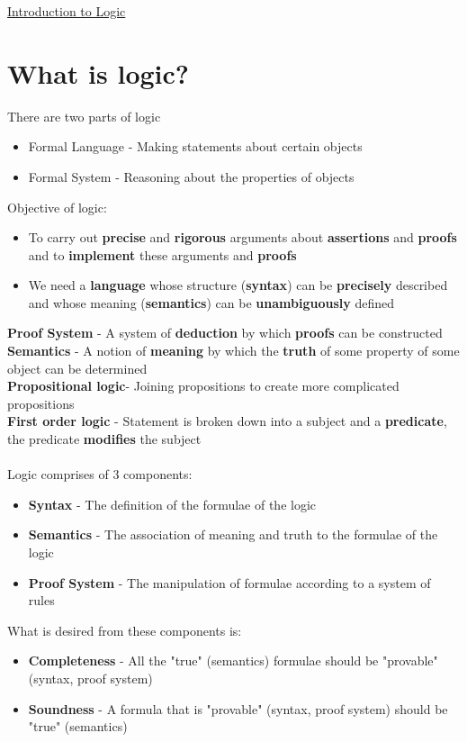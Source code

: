 \documentclass{article}[18pt]
\begin{document}
\begin{center}
\underline{\huge Introduction to Logic}
\end{center}

\section{What is logic?}
There are two parts of logic
\begin{itemize}
\item Formal Language - Making statements about certain objects
\item Formal System - Reasoning about the properties of objects
\end{itemize}
Objective of logic:
\begin{itemize}
\item To carry out \textbf{precise} and \textbf{rigorous} arguments about \textbf{assertions} and \textbf{proofs} and to \textbf{implement} these arguments and \textbf{proofs}
\item We need a \textbf{language} whose structure (\textbf{syntax}) can be \textbf{precisely} described and whose meaning (\textbf{semantics}) can be \textbf{unambiguously} defined
\end{itemize}
\textbf{Proof System} - A system of \textbf{deduction} by which \textbf{proofs} can be constructed\\
\textbf{Semantics} - A notion of \textbf{meaning} by which the \textbf{truth} of some property of some object can be determined\\



\textbf{Propositional logic}- Joining propositions to create more complicated propositions\\
\textbf{First order logic} - Statement is broken down into a subject and a \textbf{predicate}, the predicate \textbf{modifies} the subject\\
\\
Logic comprises of 3 components:
\begin{itemize}
\item \textbf{Syntax} - The definition of the formulae of the logic
\item \textbf{Semantics} - The association of meaning and truth to the formulae of the logic
\item \textbf{Proof System} - The manipulation of formulae according to a system of rules
\end{itemize}
What is desired from these components is:
\begin{itemize}
\item \textbf{Completeness} - All the "true" (semantics) formulae should be "provable"(syntax, proof system)
\item \textbf{Soundness} - A formula that is "provable" (syntax, proof system) should be "true" (semantics)
\end{itemize}
\end{document}
